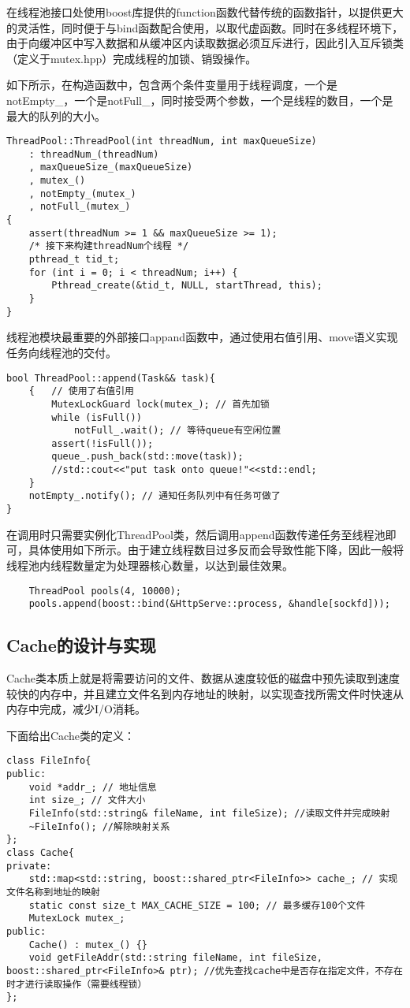 \documentclass[bachelor]{thesis-uestc}
\begin{document}
在线程池接口处使用boost库提供的function函数代替传统的函数指针，以提供更大的灵活性，同时便于与bind函数配合使用，以取代虚函数。同时在多线程环境下，由于向缓冲区中写入数据和从缓冲区内读取数据必须互斥进行，因此引入互斥锁类（定义于mutex.hpp）完成线程的加锁、销毁操作。

如下所示，在构造函数中，包含两个条件变量用于线程调度，一个是notEmpty\_，一个是notFull\_，同时接受两个参数，一个是线程的数目，一个是最大的队列的大小。

\begin{lstlisting}
ThreadPool::ThreadPool(int threadNum, int maxQueueSize)
    : threadNum_(threadNum)
    , maxQueueSize_(maxQueueSize)
    , mutex_()
    , notEmpty_(mutex_)
    , notFull_(mutex_)
{
    assert(threadNum >= 1 && maxQueueSize >= 1);
    /* 接下来构建threadNum个线程 */
    pthread_t tid_t;
    for (int i = 0; i < threadNum; i++) {
        Pthread_create(&tid_t, NULL, startThread, this);
    }
}
\end{lstlisting}

线程池模块最重要的外部接口appand函数中，通过使用右值引用、move语义实现任务向线程池的交付。
\begin{lstlisting}
bool ThreadPool::append(Task&& task){
	{   // 使用了右值引用
		MutexLockGuard lock(mutex_); // 首先加锁
		while (isFull())
			notFull_.wait(); // 等待queue有空闲位置
		assert(!isFull());
		queue_.push_back(std::move(task)); 
		//std::cout<<"put task onto queue!"<<std::endl;
	}
	notEmpty_.notify(); // 通知任务队列中有任务可做了
}
\end{lstlisting}

在调用时只需要实例化ThreadPool类，然后调用append函数传递任务至线程池即可，具体使用如下所示。由于建立线程数目过多反而会导致性能下降，因此一般将线程池内线程数量定为处理器核心数量，以达到最佳效果。

\begin{lstlisting}
	ThreadPool pools(4, 10000); 
	pools.append(boost::bind(&HttpServe::process, &handle[sockfd]));
\end{lstlisting}

\subsection{Cache的设计与实现}

Cache类本质上就是将需要访问的文件、数据从速度较低的磁盘中预先读取到速度较快的内存中，并且建立文件名到内存地址的映射，以实现查找所需文件时快速从内存中完成，减少I/O消耗。

下面给出Cache类的定义：
\begin{lstlisting}
class FileInfo{
public:
	void *addr_; // 地址信息
	int size_; // 文件大小
	FileInfo(std::string& fileName, int fileSize); //读取文件并完成映射
	~FileInfo(); //解除映射关系
};
class Cache{
private:
	std::map<std::string, boost::shared_ptr<FileInfo>> cache_; // 实现文件名称到地址的映射
	static const size_t MAX_CACHE_SIZE = 100; // 最多缓存100个文件
	MutexLock mutex_;
public:
	Cache() : mutex_() {}
	void getFileAddr(std::string fileName, int fileSize, boost::shared_ptr<FileInfo>& ptr); //优先查找cache中是否存在指定文件，不存在时才进行读取操作（需要线程锁）
};
\end{lstlisting}
\end{document}
